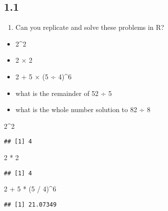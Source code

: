 \documentclass[
]{book}
\newenvironment{Shaded}{\begin{snugshade}}{\end{snugshade}}
\newcommand{\DecValTok}[1]{\textcolor[rgb]{0.00,0.00,0.81}{#1}}
\newcommand{\NormalTok}[1]{#1}
\newcommand{\SpecialCharTok}[1]{\textcolor[rgb]{0.00,0.00,0.00}{#1}}
\providecommand{\tightlist}{%
  \setlength{\itemsep}{0pt}\setlength{\parskip}{0pt}}
\begin{document}
\hypertarget{section}{%
\subsection{1.1}\label{section}}

\begin{enumerate}
\def\labelenumi{\alph{enumi}.}
\tightlist
\item
  Can you replicate and solve these problems in R?
\end{enumerate}

\begin{itemize}
\tightlist
\item
  2\^{}2
\item
  2 × 2
\item
  2 + 5 × (5 ÷ 4)\^{}6
\item
  what is the remainder of 52 ÷ 5
\item
  what is the whole number solution to 82 ÷ 8
\end{itemize}

\begin{Shaded}
\begin{Highlighting}[]
\DecValTok{2}\SpecialCharTok{\^{}}\DecValTok{2}
\end{Highlighting}
\end{Shaded}

\begin{verbatim}
## [1] 4
\end{verbatim}

\begin{Shaded}
\begin{Highlighting}[]
\DecValTok{2} \SpecialCharTok{*} \DecValTok{2}
\end{Highlighting}
\end{Shaded}

\begin{verbatim}
## [1] 4
\end{verbatim}

\begin{Shaded}
\begin{Highlighting}[]
\DecValTok{2} \SpecialCharTok{+} \DecValTok{5} \SpecialCharTok{*}\NormalTok{ (}\DecValTok{5} \SpecialCharTok{/} \DecValTok{4}\NormalTok{)}\SpecialCharTok{\^{}}\DecValTok{6}
\end{Highlighting}
\end{Shaded}

\begin{verbatim}
## [1] 21.07349
\end{verbatim}
\end{document}
